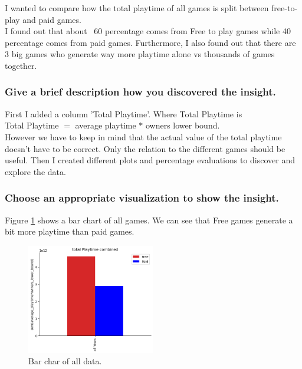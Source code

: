 \documentclass[11pt]{article}
\begin{document}
I wanted to compare how the total playtime of all games is split between free-to-play and paid games.\\
I found out that about ~60 percentage comes from Free to play games while 40 percentage comes from paid games. Furthermore, I also found out that there are 3 big games who generate way more playtime alone vs thousands of games together. 

\subsubsection{Give a brief description how you discovered the
insight.}

First I added a column 'Total Playtime'. Where Total Playtime is \\
Total Playtime $=$ average playtime $*$ owners lower bound.\\
However we have to keep in mind that the actual value of the total playtime doesn't have to be correct. Only the relation to the different games should be useful. 
Then I created different plots and percentage evaluations to discover and explore the data. 

\subsubsection{Choose an appropriate visualization to show the insight.}

Figure \ref{fig:insight1_1} shows a bar chart of all games. We can see that Free games generate a bit more playtime than paid games.\\ 
\begin{figure}[h]
    \centering
    \includegraphics[width=0.5\textwidth]{graphics/insight1_graph1.png}
    \caption{Bar char of all data.}
    \label{fig:insight1_1}
\end{figure}
\end{document}
